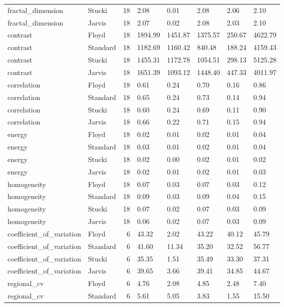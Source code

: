 \begin{tabular}{llrlllll}
fractal_dimension & Stucki & 18 & 2.08 & 0.01 & 2.08 & 2.06 & 2.10 \\
fractal_dimension & Jarvis & 18 & 2.07 & 0.02 & 2.08 & 2.03 & 2.10 \\
contrast & Floyd & 18 & 1894.99 & 1451.87 & 1375.57 & 250.67 & 4622.79 \\
contrast & Standard & 18 & 1182.69 & 1160.42 & 840.48 & 188.24 & 4159.43 \\
contrast & Stucki & 18 & 1455.31 & 1172.78 & 1054.51 & 298.13 & 5125.28 \\
contrast & Jarvis & 18 & 1651.39 & 1093.12 & 1448.40 & 447.33 & 4011.97 \\
correlation & Floyd & 18 & 0.61 & 0.24 & 0.70 & 0.16 & 0.86 \\
correlation & Standard & 18 & 0.65 & 0.24 & 0.73 & 0.14 & 0.94 \\
correlation & Stucki & 18 & 0.60 & 0.24 & 0.69 & 0.11 & 0.90 \\
correlation & Jarvis & 18 & 0.66 & 0.22 & 0.71 & 0.15 & 0.94 \\
energy & Floyd & 18 & 0.02 & 0.01 & 0.02 & 0.01 & 0.04 \\
energy & Standard & 18 & 0.03 & 0.01 & 0.02 & 0.01 & 0.04 \\
energy & Stucki & 18 & 0.02 & 0.00 & 0.02 & 0.01 & 0.02 \\
energy & Jarvis & 18 & 0.02 & 0.01 & 0.02 & 0.01 & 0.03 \\
homogeneity & Floyd & 18 & 0.07 & 0.03 & 0.07 & 0.03 & 0.12 \\
homogeneity & Standard & 18 & 0.09 & 0.03 & 0.09 & 0.04 & 0.15 \\
homogeneity & Stucki & 18 & 0.07 & 0.02 & 0.07 & 0.03 & 0.09 \\
homogeneity & Jarvis & 18 & 0.06 & 0.02 & 0.07 & 0.03 & 0.09 \\
coefficient_of_variation & Floyd & 6 & 43.32 & 2.02 & 43.22 & 40.12 & 45.79 \\
coefficient_of_variation & Standard & 6 & 41.60 & 11.34 & 35.20 & 32.52 & 56.77 \\
coefficient_of_variation & Stucki & 6 & 35.35 & 1.51 & 35.49 & 33.30 & 37.31 \\
coefficient_of_variation & Jarvis & 6 & 39.65 & 3.66 & 39.41 & 34.85 & 44.67 \\
regional_cv & Floyd & 6 & 4.76 & 2.08 & 4.85 & 2.48 & 7.40 \\
regional_cv & Standard & 6 & 5.61 & 5.05 & 3.83 & 1.55 & 15.50 \\

\end{tabular}
